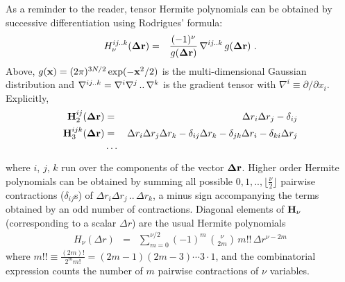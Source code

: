 \documentclass{article}
\begin{document}
As a reminder to the reader, tensor Hermite polynomials can be
obtained by successive differentiation using Rodrigues' formula:
\begin{eqnarray}
\label{Rodrigues}
H_{\nu}^{ij..k}({\bf \Delta r}) &=& \frac{(-1)^\nu}{g({\bf
    \Delta r})}\,{\bf\nabla}^{ij..k}\,g({\bf \Delta r})\ .
\end{eqnarray}
Above, $g({\bf x}) = (2\pi)^{3N/2}\exp(-{\bf x}^2/2)$ is the
multi-dimen{\-}sional Gaussian distribution and ${\bf \nabla}^{ij..k} =
\nabla^i\nabla^j\,..\,\nabla^k$ is the gradient tensor with
$\nabla^i \equiv \partial/\partial x_i$. Explicitly,
\begin{eqnarray}
{\bf H}^{ij}_2({\bf \Delta r}) &=& \Delta r_i\Delta r_j - \delta_{ij} \nonumber \\
{\bf H}^{ijk}_3({\bf \Delta r}) &=& \Delta r_i\Delta r_j\Delta r_k - \delta_{ij}\Delta r_k- \delta_{jk}\Delta r_i- \delta_{ki}\Delta r_j \nonumber \\
& \cdots &
\end{eqnarray}
where $i$, $j$, $k$ run over the components of the vector ${\bf\Delta
  r}$. Higher order Hermite polynomials can be obtained by summing all
possible $0,1,.., \lfloor\frac{\nu}{2}\rfloor$ pairwise
contractions ($\delta_{ij}$s)  of $\Delta r_i\Delta r_j\,..\,\Delta r_k$, a minus sign
accompanying the terms obtained by an odd number of
contractions. Diagonal elements of ${\bf H}_\nu$ (corresponding to a
scalar $\Delta r$) are the usual Hermite polynomials
\begin{eqnarray}
H_\nu(\Delta r) &=& \sum_{m=0}^{\nu/2} (-1)^m\, {\nu \choose 2m} \,m!!\,\Delta r^{\nu-2m}
\label{hermite_anal}
\end{eqnarray}
where $m!!\equiv \frac{(2m)!}{2^m m!} = (2m-1)(2m-3)\cdots 3\cdot
1$, and the combinatorial expression counts the number of $m$ pairwise
contractions of $\nu$ variables.
\end{document}
